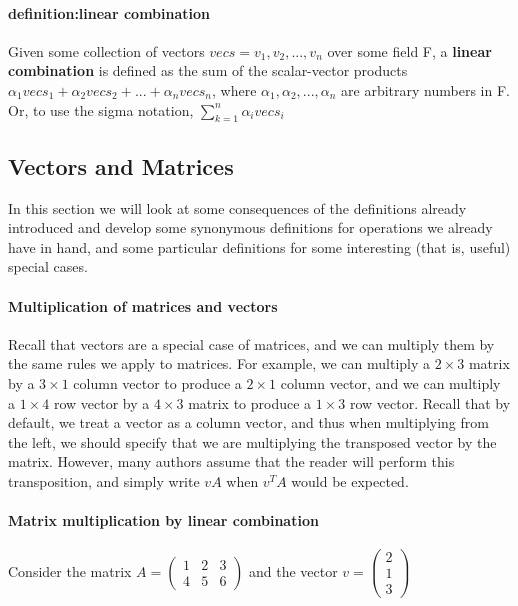 \documentclass[12pt,letterpaper,final]{article}
\begin{document}
\paragraph{definition:linear combination} Given some collection of vectors $vecs = v_1, v_2, ..., v_n$ over some field F, a \textbf{linear combination} is defined as the sum of the scalar-vector products $\alpha_1vecs_1 + \alpha_2vecs_2 + ... + \alpha_nvecs_n$, where $\alpha_1, \alpha_2, ..., \alpha_n$ are arbitrary numbers in F. Or, to use the sigma notation, $\sum_{k=1}^{n} \alpha_{i}vecs_{i}$


\subsection{Vectors and Matrices}
In this section we will look at some consequences of the definitions already introduced and develop some synonymous definitions for operations we already have in hand, and some particular definitions for some interesting (that is, useful) special cases. 

\paragraph{Multiplication of matrices and vectors} Recall that vectors are a special case of matrices, and we can multiply them by the same rules we apply to matrices. For example, we can multiply a $2 \times 3$ matrix by a $3 \times 1$ column vector to produce a $2 \times 1$ column vector, and we can multiply a $1 \times 4$ row vector by a $4 \times 3$ matrix to produce a $1 \times 3$  row vector. Recall that by default, we treat a vector as a column vector, and thus when multiplying from the left, we should specify that we are multiplying the transposed vector by the matrix. However, many authors assume that the reader will perform this transposition, and simply write $vA$ when $v^TA$ would be expected.

\paragraph{Matrix multiplication by linear combination} Consider the matrix  $A=\begin{pmatrix}
  1 & 2 & 3 \\ 4 & 5 & 6
 \end{pmatrix}
$ 
and the vector  $ v=\begin{pmatrix}
  2 \\ 1 \\3 
 \end{pmatrix}
$ 
\end{document}
